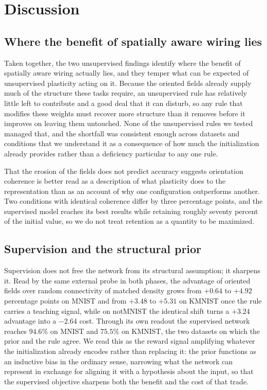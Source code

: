 \section{Discussion}

\subsection{Where the benefit of spatially aware wiring lies}

Taken together, the two unsupervised findings identify where the benefit of spatially
aware wiring actually lies, and they temper what can be expected of unsupervised
plasticity acting on it. Because the oriented fields already supply much of the structure
these tasks require, an unsupervised rule has relatively little left to contribute and a
good deal that it can disturb, so any rule that modifies these weights must recover more
structure than it removes before it improves on leaving them untouched. None of the
unsupervised rules we tested managed that, and the shortfall was consistent enough across
datasets and conditions that we understand it as a consequence of how much the
initialization already provides rather than a deficiency particular to any one rule.

That the erosion of the fields does not predict accuracy suggests orientation coherence
is better read as a description of what plasticity does to the representation than as an
account of why one configuration outperforms another. Two conditions with identical
coherence differ by three percentage points, and the supervised model reaches its best
results while retaining roughly seventy percent of the initial value, so we do not treat
retention as a quantity to be maximized.

\subsection{Supervision and the structural prior}

Supervision does not free the network from its structural assumption; it sharpens it.
Read by the same external probe in both phases, the advantage of oriented fields over
random connectivity of matched density grows from $+0.64$ to $+4.92$ percentage points on
MNIST and from $+3.48$ to $+5.31$ on KMNIST once the rule carries a teaching signal, while
on notMNIST the identical shift turns a $+3.24$ advantage into a $-2.64$ cost. Through its
own readout the supervised network reaches $94.6\%$ on MNIST and $75.5\%$ on KMNIST, the
two datasets on which the prior and the rule agree. We read this as the reward signal
amplifying whatever the initialization already encodes rather than replacing it: the prior
functions as an inductive bias in the ordinary sense, narrowing what the network can
represent in exchange for aligning it with a hypothesis about the input, so that the
supervised objective sharpens both the benefit and the cost of that trade.

